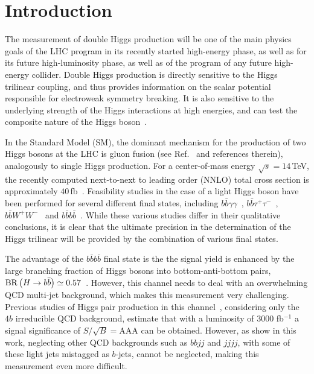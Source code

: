 \section{Introduction}

The measurement of double Higgs production will be one of the main
physics goals of the LHC program in its recently started high-energy
phase, as well as for its future high-luminosity phase, as
well as of the program of any future high-energy collider.
%
Double Higgs production is directly sensitive to the Higgs trilinear coupling, and thus 
provides information on the scalar potential responsible for electroweak symmetry breaking.
%
It is also sensitive to the underlying strength of the Higgs interactions
at high energies, and can test the composite nature of the 
Higgs boson~\cite{Giudice:2007fh,Contino:2010mh}.

In the Standard Model (SM), the dominant mechanism for the production of two Higgs bosons at the LHC is 
gluon fusion (see Ref.~\cite{baglio} and references therein), analogously to single Higgs production.
For a center-of-mass energy $\sqrt{s} = 14\,$TeV, the recently computed next-to-next to
leading order (NNLO)
total cross section is approximately $40\,$fb~\cite{deFlorian:2013jea}.
%
Feasibility studies in the case of a light Higgs boson have been performed for several different final states, including
$b\bar b\gamma\gamma$~\cite{Baur:2003gp,Barger:2013jfa},
$b\bar{b}\tau^+\tau^-$~\cite{Baur:2003gpa,Barr:2013tda,Dolan:2012rv,Dolan:2013rja},
$b\bar{b}W^+W^-$~\cite{Dolan:2012rv,Papaefstathiou:2012qe} and
$b\bar{b}b\bar{b}$~\cite{Baur:2003gpa,Dolan:2012rv,Gouzevitch:2013qca,Cooper:2013kia,Wardrope:2014kya,deLima:2014dta}.
%
While these various studies differ in their qualitative conclusions, it is clear
that the ultimate precision in the determination of the Higgs trilinear
will be provided by the combination of various final states.
%

The advantage of the $b\bar{b}b\bar{b}$ final state is the the signal yield
is enhanced by the large branching fraction of Higgs bosons into bottom-anti-bottom
pairs, ${\rm BR}\left( H\to b\bar{b}\right)\simeq 0.57$~\cite{Dittmaier:2012vm}.
%
However, this channel needs to deal with an overwhelming QCD multi-jet background,
which makes this measurement very challenging.
%
Previous studies of Higgs pair production in this
channel~\cite{Wardrope:2014kya,deLima:2014dta}, considering
only the $4b$ irreducible QCD background, estimate that with a luminosity of
3000 fb$^{-1}$ a signal significance of $S/\sqrt{B}=$AAA can be obtained.
%
However, as show in this work, neglecting other QCD backgrounds such as $bbjj$ and
$jjjj$, with some of these light jets mistagged as $b$-jets, cannot be neglected, making
this measurement even more difficult.

